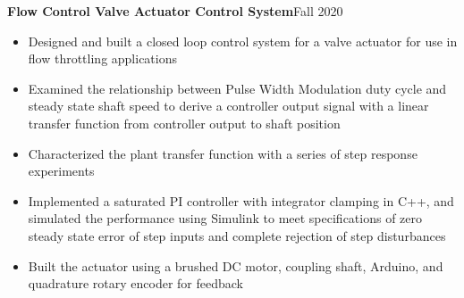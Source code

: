 \documentclass{article}
\begin{document}
\vspace{1em}
\textbf{Flow Control Valve Actuator Control System}\hfill Fall 2020
\vspace{0.5em}
\begin{itemize}
	\item Designed and built a closed loop control system for a valve actuator for use in flow throttling applications
	\item Examined the relationship between Pulse Width Modulation duty cycle and steady state shaft speed to derive a controller output signal with a linear transfer function from controller output to shaft position  
	\item Characterized the plant transfer function with a series of step response experiments
	\item  Implemented a saturated PI controller with integrator clamping in C++, and simulated the performance using Simulink to meet specifications of zero steady state error of step inputs and complete rejection of step disturbances
	\item  Built the actuator using a brushed DC motor, coupling shaft, Arduino, and quadrature rotary encoder for feedback
\end{itemize}
\vspace{0.5em}
\thispagestyle{empty}
\thispagestyle{empty}
\end{document}
